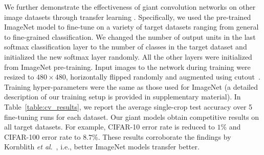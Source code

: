 \documentclass{article}
\def\onedot{.}
\def\etal{\emph{et al}\onedot}
\begin{document}
We further demonstrate the effectiveness of giant convolution networks on other image datasets through transfer learning \cite{Razavian2014,Shelhamer2017}. Specifically, we used the pre-trained ImageNet model to fine-tune on a variety of target datasets ranging from general to fine-grained classification. We changed the number of output units in the last softmax classification layer to the number of classes in the target dataset and initialized the new softmax layer randomly. All the other layers were initialized from ImageNet pre-training. Input images to the network during training were resized to $480\times480$, horizontally flipped randomly and augmented using cutout~\cite{devries2017improved}. Training hyper-parameters were the same as those used for ImageNet (a detailed description of our training setup is provided in supplementary material). In Table~\ref{table:cv_results}, we report the average single-crop test accuracy over 5 fine-tuning runs for each dataset. Our giant models obtain competitive results on all target datasets. For example, CIFAR-10 error rate is reduced to $1\%$ and CIFAR-100 error rate to $8.7\%$. These results corroborate the findings by Kornblith \etal~\cite{Kornblith2018}, i.e., better ImageNet models transfer better.
\end{document}
